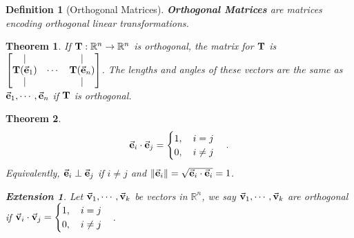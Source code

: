 \documentclass[12pt, a4paper]{article}
\newtheorem{thm}{Theorem}[subsection]
\newtheorem{df}{Definition}[subsection]
\newtheorem*{ext}{\indent Extension}
\def\R{{\mathbb{R}}}
\def\T{{\vb{T}}}
\def\vecv{\va{v}}
\def\vece{\va{e}}
\begin{document}
\begin{df}[Orthogonal Matrices]
	\textbf{Orthogonal Matrices} are matrices encoding orthogonal linear transformations.	
\end{df}
\begin{thm}
	If $\T:\R^n\to\R^n$ is orthogonal, the matrix for $\T$ is $\begin{bmatrix}|&&|\\\T(\vece_1)&\cdots&\T(\vece_n)\\|&&|\end{bmatrix}$. The lengths and angles of these vectors are the same as $\vece_1,\cdots,\vece_n$ if $\T$ is orthogonal. 
\end{thm}
\begin{thm}
	\[\vece_i\cdot\vece_j=\begin{cases}1,\quad i=j\\0,\quad i\neq j\end{cases}.\]
	Equivalently, $\vece_i\perp\vece_j$ if $i\neq j$ and $\|\vece_i\|=\sqrt{\vece_i\cdot\vece_i}=1$.
	\begin{ext}
		Let $\vecv_1,\cdots,\vecv_k$	 be vectors in $\R^n$, we say $\vecv_1,\cdots,\vecv_k$	 are orthogonal if $\vecv_i\cdot\vecv_j=\begin{cases}1,\quad i=j\\0,\quad i\neq j\end{cases}$.
	\end{ext}
\end{thm}
\end{document}
